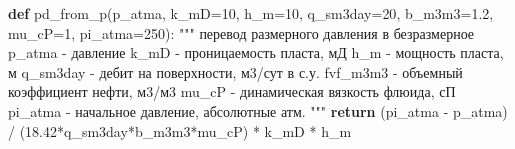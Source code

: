 \documentclass[
  russian,
  letterpaper,
  DIV=11,
  numbers=noendperiod,
  oneside]{scrartcl}
\newenvironment{Shaded}{\begin{snugshade}}{\end{snugshade}}
\newcommand{\CommentTok}[1]{\textcolor[rgb]{0.37,0.37,0.37}{#1}}
\newcommand{\ControlFlowTok}[1]{\textcolor[rgb]{0.00,0.23,0.31}{\textbf{#1}}}
\newcommand{\DecValTok}[1]{\textcolor[rgb]{0.68,0.00,0.00}{#1}}
\newcommand{\FloatTok}[1]{\textcolor[rgb]{0.68,0.00,0.00}{#1}}
\newcommand{\KeywordTok}[1]{\textcolor[rgb]{0.00,0.23,0.31}{\textbf{#1}}}
\newcommand{\NormalTok}[1]{\textcolor[rgb]{0.00,0.23,0.31}{#1}}
\newcommand{\OperatorTok}[1]{\textcolor[rgb]{0.37,0.37,0.37}{#1}}
\begin{document}
\begin{Shaded}
\begin{Highlighting}[]
\KeywordTok{def}\NormalTok{ pd\_from\_p(p\_atma, }
\NormalTok{              k\_mD}\OperatorTok{=}\DecValTok{10}\NormalTok{, h\_m}\OperatorTok{=}\DecValTok{10}\NormalTok{, }
\NormalTok{              q\_sm3day}\OperatorTok{=}\DecValTok{20}\NormalTok{, b\_m3m3}\OperatorTok{=}\FloatTok{1.2}\NormalTok{, mu\_cP}\OperatorTok{=}\DecValTok{1}\NormalTok{, pi\_atma}\OperatorTok{=}\DecValTok{250}\NormalTok{):}
    \CommentTok{"""}
\CommentTok{    перевод размерного давления в безразмерное}
\CommentTok{    p\_atma {-} давление}
\CommentTok{    k\_mD {-} проницаемость пласта, мД}
\CommentTok{    h\_m {-} мощность пласта, м}
\CommentTok{    q\_sm3day {-} дебит на поверхности, м3/сут в с.у.}
\CommentTok{    fvf\_m3m3 {-} объемный коэффициент нефти, м3/м3}
\CommentTok{    mu\_cP {-} динамическая вязкость флюида, сП}
\CommentTok{    pi\_atma {-} начальное давление, абсолютные атм.}
\CommentTok{    """}
    \ControlFlowTok{return}\NormalTok{ (pi\_atma }\OperatorTok{{-}}\NormalTok{ p\_atma) }\OperatorTok{/}\NormalTok{ (}\FloatTok{18.42}\OperatorTok{*}\NormalTok{q\_sm3day}\OperatorTok{*}\NormalTok{b\_m3m3}\OperatorTok{*}\NormalTok{mu\_cP) }\OperatorTok{*}\NormalTok{ k\_mD }\OperatorTok{*}\NormalTok{ h\_m }
\end{Highlighting}
\end{Shaded}
\end{document}
